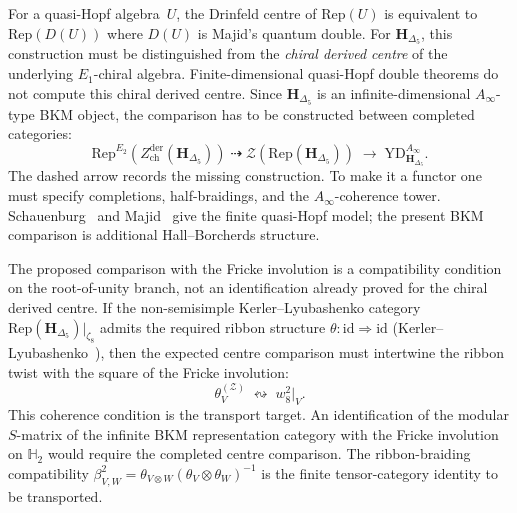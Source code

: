 \begin{remark}
\label{rem:dc-center-ratio}
For a quasi-Hopf algebra~$U$, the Drinfeld centre of
$\mathrm{Rep}(U)$ is equivalent to $\mathrm{Rep}(D(U))$ where $D(U)$
is Majid's quantum double. For
$\mathbf{H}_{\Delta_5}$, this construction must be distinguished from
the \emph{chiral derived centre} of the underlying $E_1$-chiral
algebra. Finite-dimensional quasi-Hopf double theorems do not compute
this chiral derived centre. Since $\mathbf{H}_{\Delta_5}$ is an
infinite-dimensional \(A_\infty\)-type BKM object, the comparison has
to be constructed between completed categories:
\begin{equation}
\label{eq:dc-center-ratio-inclusion}
 \mathrm{Rep}^{E_2}(Z^{\mathrm{der}}_{\mathrm{ch}}(\mathbf{H}_{\Delta_5}))
 \;\dashrightarrow\;
 \mathcal{Z}(\mathrm{Rep}(\mathbf{H}_{\Delta_5}))
\;\to\;
\mathrm{YD}^{A_\infty}_{\mathbf{H}_{\Delta_5}}.
\end{equation}
The dashed arrow records the missing construction. To make it a
functor one must specify completions, half-braidings, and the
\(A_\infty\)-coherence tower. Schauenburg~\cite{Schauenburg1998DoubleQHopf} and
Majid~\cite{Majid1995} give the finite quasi-Hopf model; the present
BKM comparison is additional Hall--Borcherds structure.
\end{remark}

\begin{remark}
\label{rem:dc-fricke-s-matrix}
The proposed comparison with the Fricke involution is a compatibility
condition on the root-of-unity branch, not an identification already
proved for the chiral derived centre. If the non-semisimple
Kerler--Lyubashenko category
$\mathrm{Rep}(\mathbf{H}_{\Delta_5})|_{\zeta_8}$ admits the required
ribbon structure
$\theta\colon \mathrm{id} \Rightarrow \mathrm{id}$
(Kerler--Lyubashenko~\cite{KerlerLyubashenko2001LMS262}), then the
expected centre comparison must intertwine the ribbon twist with the
square of the Fricke involution:
\begin{equation}
\label{eq:dc-fricke-ribbon}
 \theta^{(\mathcal{Z})}_V
 \;\leftrightsquigarrow\;
 w_8^2\bigl|_{V}.
\end{equation}
This coherence condition is the transport target. An identification of
the modular \(S\)-matrix of the infinite BKM representation category
with the Fricke involution on \(\mathbb H_2\) would require the completed
centre comparison. The ribbon-braiding compatibility
$\beta^2_{V,W} = \theta_{V\otimes W} (\theta_V \otimes \theta_W)^{-1}$
is the finite tensor-category identity to be transported.
\end{remark}

